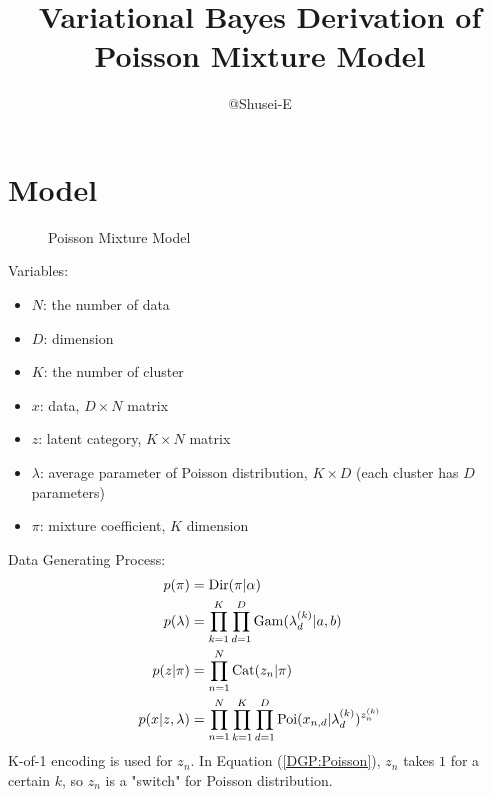 \documentclass[a4paper,10.5pt,dvipdfmx]{jarticle}  %
\def\tightlist{
	\itemsep1pt
	\parskip1pt
	\parsep1pt
	\itemindent20pt
}
\begin{document}
\title{Variational Bayes Derivation of Poisson Mixture Model}
\author{@Shusei-E}
\maketitle

\section{Model}
\begin{figure}[H]
\centering
{}
\caption{Poisson Mixture Model}
\end{figure}
\noindent
Variables:
\begin{itemize}
	\tightlist
	\item $N$: the number of data
	\item $D$: dimension
	\item $K$: the number of cluster
	\item $x$: data, $D \times N$ matrix
	\item $z$: latent category, $K \times N$ matrix
	\item $\lambda$: average parameter of Poisson distribution, $K \times D$ (each cluster has $D$ parameters)
	\item $\pi$: mixture coefficient, $K$ dimension
\end{itemize}
Data Generating Process:
\begin{align}
	p(\pi) &= {\rm Dir}(\pi | \alpha)\\
	p(\lambda) &= \prod_{k=1}^{K} \prod_{d=1}^{D} {\rm Gam} (\lambda_{d}^{(k)} | a,b)\\
	p(z|\pi) &= \prod_{n=1}^{N} {\rm Cat}(z_n | \pi)\\
	p(x | z, \lambda) &= \prod_{n=1}^{N} \prod_{k=1}^{K} \prod_{d=1}^{D} {\rm Poi} (x_{n,d} | \lambda_{d}^{(k)})^{z_{n}^{(k)}} \label{DGP:Poisson}
\end{align}
K-of-1 encoding is used for $z_n$. In Equation (\ref{DGP:Poisson}), $z_n$ takes $1$ for a certain $k$, so $z_n$ is a "switch" for Poisson distribution.
\end{document}

